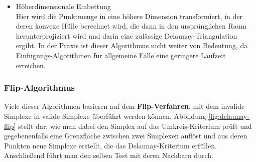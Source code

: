 \begin{itemize}
  Cignoni et al.\cite{cignoni_1998} haben eine DeWall genannte\footnote{DeWall steht hier für Delaunay Wall Algorithm, so benannt nach den Wänden, an denen getrennt und wieder verknüpft wird} Methode gefunden, die eine zwar worst-case-Laufzeit von  ergibt, die sich jedoch nur in pathologischen Fällen zeigt.
  Nimmt man annähernde Gleichverteilungen an, die im vorliegenden Anwendungsfall gegeben sind, konvergiert dieser Algorithmus in drei Dimensionen subquadratisch und ist somit vergleichbar effizient.
  Es zeigt sich allerdings, dass er trotz der vermeintlich langen Laufzeit vor allem bei periodischen und periodisch erweiterten Systemen effizient arbeitet, da hier ohnehin Grenzflächen existieren, an denen Teiltriangulationen auf einander abgestimmt werden müssen.
  Andererseits ist das Parsivald-Modell ohnehin für parallele Platformen ausgelegt, so dass hier weitere Leistungssteigerungen zu erwarten sind.
  Ebenso eignet sich diese Methode zur Einbettung neu berechneter Würfel in die Struktur, wie es beim Parsivald-Modell nach jeder simulierten Reaktion vorkommt.

\item Höherdimensionale Einbettung\\
  Hier wird die Punktmenge in eine höhere Dimension transformiert, in der deren konvexe Hülle berechnet wird, die dann in den ursprünglichen Raum herunterprojiziert wird und darin eine zulässige Delaunay-Triangulation ergibt.
  In der Praxis ist dieser Algorithmus nicht weiter von Bedeutung, da Einfügungs-Algorithmen für allgemeine Fälle eine geringere Laufzeit erreichen.

\end{itemize}

\subsubsection{Flip-Algorithmus}

Viele dieser Algorithmen basieren auf dem \textbf{Flip-Verfahren}, mit dem invalide Simplexe in valide Simplexe überführt werden können.
Abbildung \ref{fig:delaunay-flip} stellt dar, wie man dabei den Simplex auf das Umkreis-Kriterium prüft und gegebenenfalls eine Grenzfläche zwischen zwei Simplexen auflöst und aus deren Punkten neue Simplexe erstellt, die das Delaunay-Kriterium erfüllen.
Anschließend führt man den selben Test mit deren Nachbarn durch.

